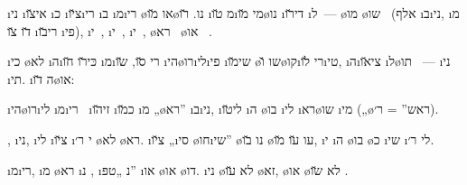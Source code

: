 \i{ני} \i{אי}\u{צו}  \i{כ}  \i{צ}\u{יו}\i{רי} \i{ב}  \i{מ}\i{רי}  \o{או} \u{מו}\o{נו}.  \u{רו} \i{מ} \u{טו}\i{מי} \u{מו}\o{נו} \i{די}\u{רו}  \i{ל}~— \o{מו}  \o{שו}~ (אלף \i{ב}\i{ני}, \i{מ} \u{דו} \u{צו} \i{רי}\u{בו} \i{פי}), \i{י}~, \i{י}~, \i{י}~, \o{רא}~ \o{או} ~.

\i{כי} \o{לא} \i{ה}\i{כּי}\u{רו}  \u{חו}  \i{מ}\i{רי} \u{סו}, \u{שו} \i{הי}\o{רו}\i{לי}\i{פי} \i{שי}\u{מו} \o{שו} \u{ו}\o{קו}\i{רי} \u{לו}\i{טי}, \i{ה}\i{צי}\u{או}     \i{ל}\o{תו}   ~— \i{ני} \i{תי}. \i{ה}  \u{דו}\o{או}:

 \i{הי}\o{רו}\i{לי} \i{מ}\i{רי}~  \i{זי}\u{הו} \i{כ}\u{מו}  \i{מ} „\o{רא}” \i{ב}\i{ני}, \i{לי}\u{טו} \i{ה} \o{בו}     \i{לי} \i{רא}\o{שו}  \i{מי} („\o{רא}ש” = ר׳).

,  \i{ני}, \i{לי}  \i{צ}\u{יו} \i{י} ר׳ \o{לא} \o{רא}. \i{צ}\u{יו}  „\i{סי} \o{חו}\i{שי}” \o{נו} \u{בו} \o{עו} \u{עו} \u{מו},  \i{י} \i{ה} \o{בו} \o{כ}  \i{שי}   \i{לי} ר׳.

\i{מ}\i{רי}, \i{מ} \o{רא} \i{נ}  , \i{נ}  „טפּ” \i{או} \o{או} \o{דו}.  \i{ני} \o{לא} \u{עו} \o{זא}, \o{או}  \o{לא}  \u{שו} .

